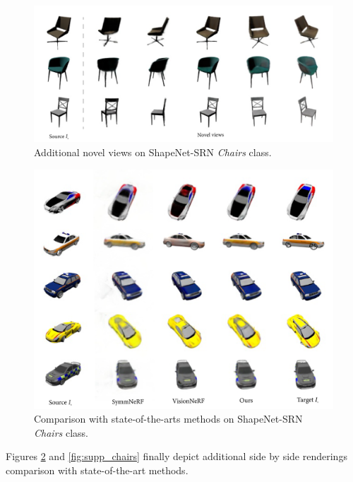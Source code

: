 \begin{figure}[htp!]
    \begin{center}
  \includegraphics[width=\linewidth]{images/epinerf/supp_NVS_Chairs.png}
  \caption{Additional novel views on ShapeNet-SRN \textit{Chairs} class.}
  \label{fig:supp_NVSchairs}
  \end{center}
\end{figure}

\begin{figure}[h!]
    \begin{center}
  \includegraphics[width=\linewidth]{images/epinerf/supp_Cars_additional_inference.png}
  \caption{Comparison with state-of-the-arts methods on ShapeNet-SRN \textit{Chairs} class.}
  \label{fig:supp_cars}
  \end{center}
\end{figure}

Figures \ref{fig:supp_cars} and \ref{fig:supp_chairs} finally depict additional side by side renderings comparison with state-of-the-art methods. 

